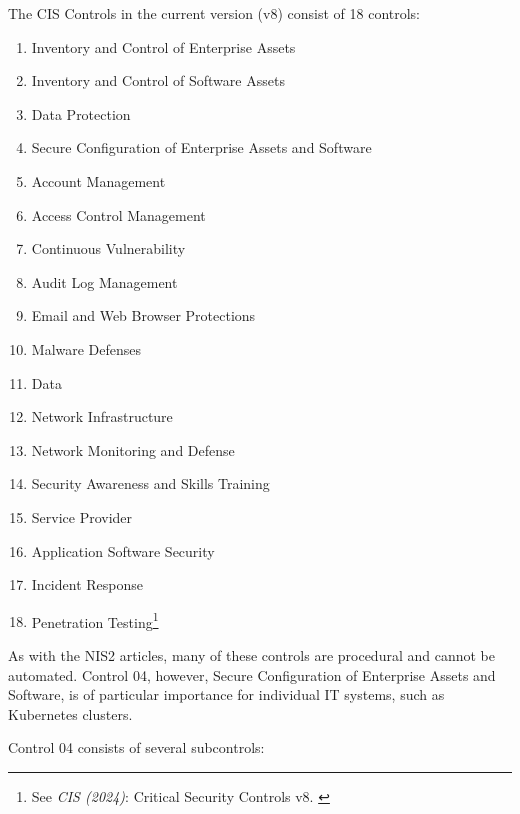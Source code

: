 The CIS Controls in the current version (v8) consist of 18 controls:

\begin{enumerate}
    \item Inventory and Control of Enterprise Assets
    \item Inventory and Control of Software Assets
    \item Data Protection
    \item Secure Configuration of Enterprise Assets and Software
    \item Account Management
    \item Access Control Management
    \item Continuous Vulnerability
    \item Audit Log Management
    \item Email and Web Browser Protections
    \item Malware Defenses
    \item Data
    \item Network Infrastructure
    \item Network Monitoring and Defense
    \item Security Awareness and Skills Training
    \item Service Provider
    \item Application Software Security
    \item Incident Response
    \item Penetration Testing\footnote{See \textit{CIS (2024)}: Critical Security Controls v8. \cite{cisControls}}
\end{enumerate}

As with the NIS2 articles, many of these controls are procedural and cannot be automated. Control 04, however, Secure Configuration of Enterprise Assets and Software, is of particular importance for individual IT systems, such as Kubernetes clusters.

Control 04 consists of several subcontrols:

